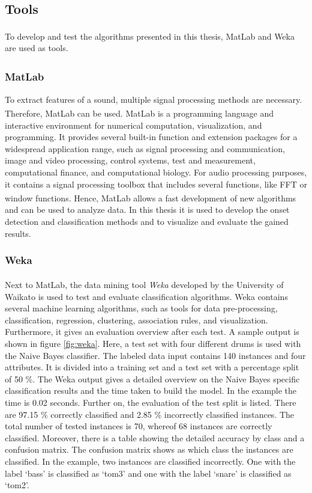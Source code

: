 \subsection{Tools}

To develop and test the algorithms presented in this thesis, MatLab\textsuperscript{\textregistered} and Weka are used as tools.

\subsubsection{MatLab\textsuperscript{\textregistered}}
To extract features of a sound, multiple signal processing methods are necessary. Therefore, MatLab\textsuperscript{\textregistered} \autocite{MathWorks:2014} can be used. MatLab\textsuperscript{\textregistered} is a programming language and interactive environment for numerical computation, visualization, and programming. It provides several built-in function and extension packages for a widespread application range, such as signal processing and communication, image and video processing, control systems, test and measurement, computational finance, and computational biology. For audio processing purposes, it contains a signal processing toolbox that includes several functions, like FFT or window functions. Hence, MatLab\textsuperscript{\textregistered} allows a fast development of new algorithms and can be used to analyze data. In this thesis it is used to develop the onset detection and classification methods and to visualize and evaluate the gained results.

\subsubsection{Weka}

Next to MatLab\textsuperscript{\textregistered}, the data mining tool \textit{Weka} developed by the University of Waikato \autocite{Weka:2014} is used to test and evaluate classification algorithms. Weka contains several machine learning algorithms, such as tools for data pre-processing, classification, regression, clustering, association rules, and visualization. Furthermore, it gives an evaluation overview after each test. A sample output is shown in figure \ref{fig:weka}. Here, a test set with four different drums is used with the Naive Bayes classifier. The labeled data input contains 140 instances and four attributes. It is divided into a training set and a test set with a percentage split of 50 \%. The Weka output gives a detailed overview on the Naive Bayes specific classification results and the time taken to build the model. In the example the time is 0.02 seconds. Further on, the evaluation of the test split is listed. There are 97.15 \% correctly classified and 2.85 \% incorrectly classified instances. The total number of tested instances is 70, whereof 68 instances are correctly classified. Moreover, there is a table showing the detailed accuracy by class and a confusion matrix. The confusion matrix shows as which class the instances are classified. In the example, two instances are classified incorrectly. One with the label `bass' is classified as `tom3' and one with the label `snare' is classified as `tom2'.

